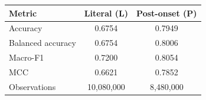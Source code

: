 


\begin{tabular}{lcc}
\toprule
Metric & Literal (L) & Post-onset (P)\\
\midrule
Accuracy & 0.6754 & 0.7949\\
Balanced accuracy & 0.6754 & 0.8006\\
Macro-F1 & 0.7200 & 0.8054\\
MCC & 0.6621 & 0.7852\\
Observations & 10,080,000 & 8,480,000\\
\bottomrule
\end{tabular}
